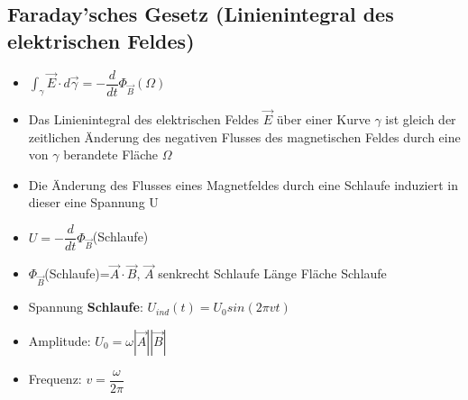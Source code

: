 \documentclass[8pt,a4paper]{scrartcl}
\begin{document}
\begin{multicols*}{3}
				\subsection{Faraday'sches Gesetz (Linienintegral des elektrischen Feldes)}
					\begin{itemize}\itemsep0pt
						\item $\int_{\gamma} \overrightarrow{E} \cdot d \overrightarrow{\gamma} = - \dfrac{d}{dt} \Phi_{\overrightarrow{B}}(\Omega)$
						\item Das Linienintegral des elektrischen Feldes $\overrightarrow{E}$ über einer Kurve $\gamma$ ist gleich der zeitlichen Änderung des negativen Flusses des magnetischen Feldes durch eine von $\gamma$ berandete Fläche $\Omega$
						\item Die Änderung des Flusses eines Magnetfeldes durch eine Schlaufe induziert in dieser eine Spannung U
						\item $U=-\dfrac{d}{dt}\Phi_{\overrightarrow{B}}$(Schlaufe)
						\item $\Phi_{\overrightarrow{B}}$(Schlaufe)=$\overrightarrow{A}\cdot \overrightarrow{B}$, $\overrightarrow{A}$ senkrecht Schlaufe Länge Fläche Schlaufe
						\item Spannung \textbf{Schlaufe}: $U_{ind}(t) = U_{0}sin(2\pi vt)$
						\item Amplitude: $U_{0} = \omega |\overrightarrow{A}||\overrightarrow{B}|$
						\item Frequenz: $v = \dfrac{\omega}{2\pi}$
					\end{itemize}	

\end{multicols*}
\end{document}
